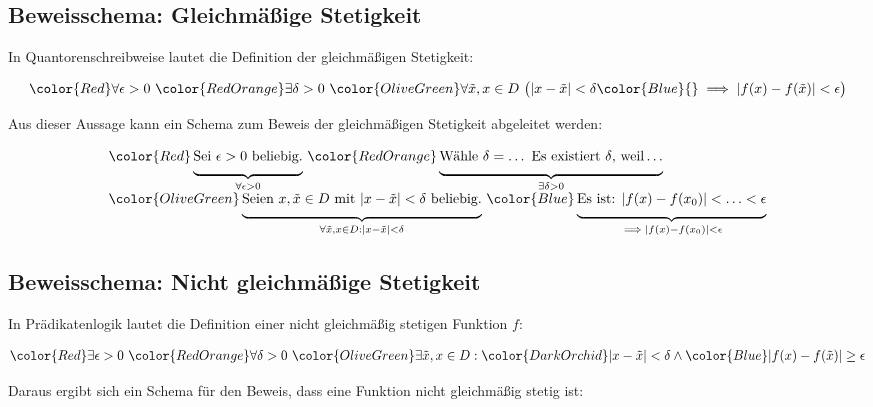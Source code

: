\documentclass[fontsize=9pt,
               parskip=half-,
               DIV=14,
               listof=chapterentry,
               tocflat]{scrbook}
\begin{document}
\subsection{Beweisschema: Gleichmäßige Stetigkeit}

In Quantorenschreibweise lautet die Definition der gleichmäßigen Stetigkeit:

\begin{align*}
{\color {Red}\forall \epsilon >0}\ {\color {RedOrange}\exists \delta >0}\ {\color {OliveGreen}\forall {\tilde {x}},x\in D\ {\big (}|x-{\tilde {x}}|<\delta }{\color {Blue}{}\implies |f(x)-f({\tilde {x}})|<\epsilon {\big )}}
\end{align*}

Aus dieser Aussage kann ein Schema zum Beweis der gleichmäßigen Stetigkeit abgeleitet werden:

\begin{align*}
{\begin{array}{l}{\color {Red}\underbrace {{\underset {}{}}{\text{Sei }}\epsilon >0{\text{ beliebig.}}} _{\forall \epsilon >0}}\ {\color {RedOrange}\underbrace {{\underset {}{}}{\text{Wähle }}\delta =\ldots {\text{ Es existiert }}\delta {\text{, weil}}\ldots } _{\exists \delta >0}}\\{\color {OliveGreen}\underbrace {{\underset {}{}}{\text{Seien }}x,{\tilde {x}}\in D{\text{ mit }}|x-{\tilde {x}}|<\delta {\text{ beliebig.}}} _{\forall {\tilde {x}},x\in D:|x-{\tilde {x}}|<\delta }}\ {\color {Blue}\underbrace {{\underset {}{}}{\text{Es ist: }}|f(x)-f(x_{0})|<\ldots <\epsilon } _{{}\implies |f(x)-f(x_{0})|<\epsilon }}\end{array}}
\end{align*}

\subsection{Beweisschema: Nicht gleichmäßige Stetigkeit}

In Prädikatenlogik lautet die Definition einer nicht gleichmäßig stetigen Funktion $f$:

\begin{align*}
{\color {Red}\exists \epsilon >0}\ {\color {RedOrange}\forall \delta >0}\ {\color {OliveGreen}\exists {\tilde {x}},x\in D}:{\color {DarkOrchid}|x-{\tilde {x}}|<\delta }\land {\color {Blue}|f(x)-f({\tilde {x}})|\geq \epsilon }
\end{align*}

Daraus ergibt sich ein Schema für den Beweis, dass eine Funktion nicht gleichmäßig stetig ist:
\end{document}
